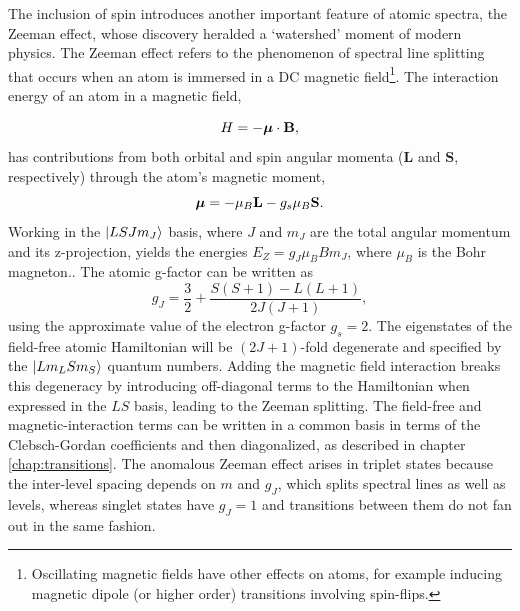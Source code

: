 	The inclusion of spin introduces another important feature of atomic spectra, the Zeeman effect, whose discovery heralded a `watershed' moment of modern physics.
	The Zeeman effect refers to the phenomenon of spectral line splitting that occurs when an atom is immersed in a DC magnetic field\footnote{Oscillating magnetic fields have other effects on atoms, for example inducing magnetic dipole (or higher order) transitions involving spin-flips.}.
	The interaction energy of an atom in a magnetic field, 
	
	\begin{equation}
		H = -\text{\boldmath$\mu$}\cdot \textbf{B},
	\end{equation}
	has contributions from both orbital and spin angular momenta ($\textbf{L}$ and $\textbf{S}$, respectively) through the atom's magnetic moment,
	\begin{equation}
		\text{\boldmath$\mu$} = -\mu_B\textbf{L} - g_s\mu_B \textbf{S}.
	\end{equation}
	Working in the $|LSJm_J\rangle$ basis, where $J$ and $m_J$ are the total angular momentum and its z-projection, yields the energies $E_Z = g_J \mu_B B m_J$, where $\mu_B$ is the Bohr magneton..
	The atomic g-factor can be written as
	\begin{equation}
		g_J = \frac{3}{2} + \frac{S(S+1)-L(L+1)}{2J(J+1)},
	\end{equation}
	using the approximate value of the electron g-factor $g_s=2$.
	The eigenstates of the field-free atomic Hamiltonian will be $(2J+1)$-fold degenerate and specified by the $|Lm_L S m_S\rangle$ quantum numbers.
	Adding the magnetic field interaction breaks this degeneracy by introducing off-diagonal terms to the Hamiltonian when expressed in the $LS$ basis,  leading to the Zeeman splitting.
	The field-free and magnetic-interaction terms can be written in a common basis in terms of the Clebsch-Gordan coefficients and then diagonalized, as described in chapter \ref{chap:transitions}.
	The anomalous Zeeman effect arises in triplet states because the inter-level spacing depends on $m$ and $g_J$, which splits spectral lines as well as levels, whereas singlet states have $g_J=1$ and transitions between them do not fan out in the same fashion.
	
